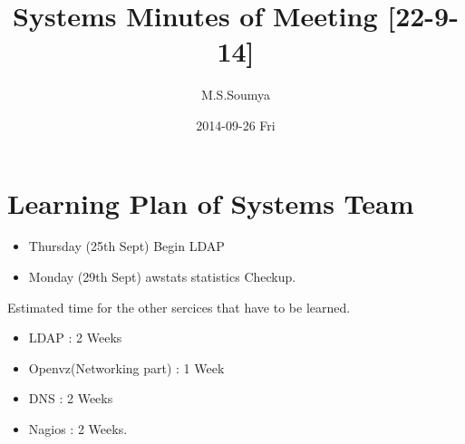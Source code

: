 \documentclass[11pt]{article}
\title{Systems Minutes of Meeting [22-9-14]}
\author{M.S.Soumya}
\date{2014-09-26 Fri}
\begin{document}
\maketitle

\setcounter{tocdepth}{3}
\tableofcontents
\vspace*{1cm}

\section{Learning Plan of Systems Team}
\label{sec-1}

\begin{itemize}
\item Thursday (25th Sept) Begin LDAP
\item Monday (29th Sept) awstats statistics Checkup.
\end{itemize}

Estimated time for the other sercices that have to be learned.
 
\begin{itemize}
\item LDAP : 2 Weeks
\item Openvz(Networking part) : 1 Week
\item DNS : 2 Weeks
\item Nagios : 2 Weeks.
\end{itemize}
\end{document}
